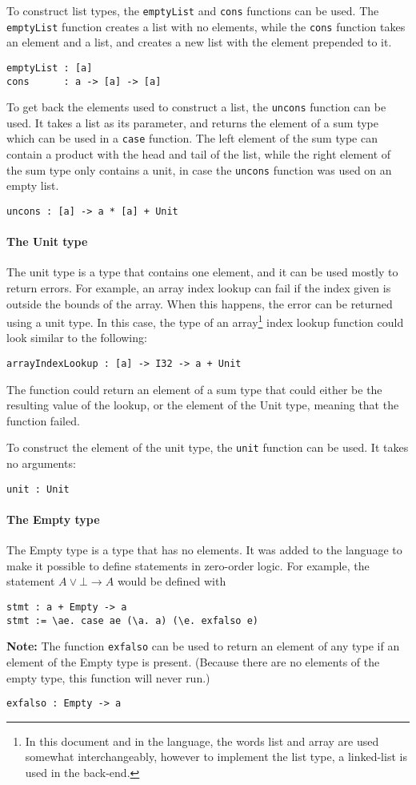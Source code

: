 \documentclass[12pt]{article}
\begin{document}
To construct list types, the \verb$emptyList$ and \verb$cons$ functions can be
used. The \verb$emptyList$ function creates a list with no elements, while the
\verb$cons$ function takes an element and a list, and creates a new list with
the element prepended to it.
\begin{lstlisting}
emptyList : [a]
cons      : a -> [a] -> [a]
\end{lstlisting}
To get back the elements used to construct a list, the \verb$uncons$ function
can be used. It takes a list as its parameter, and returns the element of a sum
type which can be used in a \verb$case$ function. The left element of the sum
type can contain a product with the head and tail of the list, while the right
element of the sum type only contains a unit, in case the \verb$uncons$ function
was used on an empty list.
\begin{lstlisting}
uncons : [a] -> a * [a] + Unit
\end{lstlisting}

\paragraph{The Unit type} The unit type is a type that contains one element, and
it can be used mostly to return errors. For example, an array index lookup can
fail if the index given is outside the bounds of the array. When this happens,
the error can be returned using a unit type. In this case, the type of an 
array\footnote{In this document and in the language, the words list and array 
    are used somewhat interchangeably, however to implement the list type, a
    linked-list is used in the back-end.} index lookup function could look
    similar to the following:
\begin{lstlisting}
arrayIndexLookup : [a] -> I32 -> a + Unit
\end{lstlisting}
The function could return an element of a sum type that could either be the
resulting value of the lookup, or the element of the Unit type, meaning that the
function failed.

To construct the element of the unit type, the \verb$unit$ function can be used.
It takes no arguments:
\begin{lstlisting}
unit : Unit
\end{lstlisting}

\paragraph{The Empty type} The Empty type is a type that has no elements. It was
added to the language to make it possible to define statements in zero-order
logic. For example, the statement $A \vee \bot \rightarrow A$ would be defined
with
\begin{lstlisting}
stmt : a + Empty -> a
stmt := \ae. case ae (\a. a) (\e. exfalso e)
\end{lstlisting}
\textbf{Note:} The function \verb$exfalso$ can be used to return an element of
any type if an element of the Empty type is present. (Because there are no
elements of the empty type, this function will never run.)
\begin{lstlisting}
exfalso : Empty -> a
\end{lstlisting}
\end{document}
